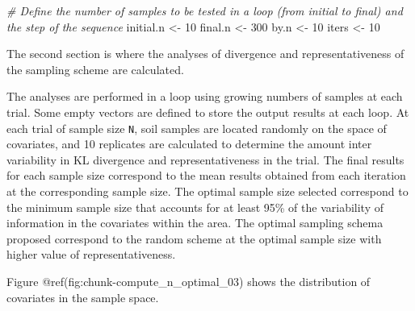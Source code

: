 \documentclass[
]{book}
\newenvironment{Shaded}{\begin{snugshade}}{\end{snugshade}}
\newcommand{\CommentTok}[1]{\textcolor[rgb]{0.56,0.35,0.01}{\textit{#1}}}
\newcommand{\DecValTok}[1]{\textcolor[rgb]{0.00,0.00,0.81}{#1}}
\newcommand{\NormalTok}[1]{#1}
\newcommand{\OtherTok}[1]{\textcolor[rgb]{0.56,0.35,0.01}{#1}}
\begin{document}
\begin{Shaded}
\begin{Highlighting}[]
  \CommentTok{\# Define the number of samples to be tested in a loop (from initial to final) and the step of the sequence}
\NormalTok{  initial.n }\OtherTok{\textless{}{-}} \DecValTok{10}
\NormalTok{  final.n }\OtherTok{\textless{}{-}} \DecValTok{300}
\NormalTok{  by.n }\OtherTok{\textless{}{-}} \DecValTok{10}
\NormalTok{  iters }\OtherTok{\textless{}{-}} \DecValTok{10}
\end{Highlighting}
\end{Shaded}

The second section is where the analyses of divergence and representativeness of the sampling scheme are calculated.

The analyses are performed in a loop using growing numbers of samples at each trial. Some empty vectors are defined to store the output results at each loop. At each trial of sample size \texttt{\textquotesingle{}N\textquotesingle{}}, soil samples are located randomly on the space of covariates, and 10 replicates are calculated to determine the amount inter variability in KL divergence and representativeness in the trial. The final results for each sample size correspond to the mean results obtained from each iteration at the corresponding sample size. The optimal sample size selected correspond to the minimum sample size that accounts for at least 95\% of the variability of information in the covariates within the area. The optimal sampling schema proposed correspond to the random scheme at the optimal sample size with higher value of representativeness.

Figure @ref(fig:chunk-compute\_n\_optimal\_03) shows the distribution of covariates in the sample space.
\end{document}
